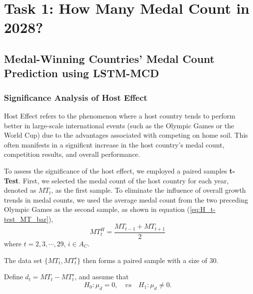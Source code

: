 \documentclass{mcmthesis}
\begin{document}
	
	
	
	
	\newpage
	\section{Task 1: How Many Medal Count in 2028? }
	\subsection{Medal-Winning Countries' Medal Count Prediction using LSTM-MCD}
	
	\subsubsection{Significance Analysis of Host Effect}
	
Host Effect refers to the phenomenon where a host country tends to perform better in large-scale international events (such as the Olympic Games or the World Cup) due to the advantages associated with competing on home soil. This often manifests in a significnt increase in the host country's medal count, competition results, and overall performance.

	
	To assess the significance of the host effect, we employed a paired samples  \textbf{t-Test}. First, we selected the medal count of the host country for each year, denoted as $MT_{t}$, as the first sample. To eliminate the influence of overall growth trends in medal counts, we used the average medal count from the two preceding Olympic Games as the second sample, as shown in equation (\ref{eq:H_t-test_MT_bar}),
	\begin{equation*}
		MT^H_{t}=\frac{ MT_{t-1} + MT_{t+1} }{2}
		\label{eq:H_t-test_MT_bar}
	\end{equation*}
	where $t=2,3,\cdots,29$, $i\in A_{C}$. 
	
	The data set $\{MT_{t},MT^s_{t}\}$ then forms a paired sample with a size of 30. 
	
	Define $d_t= MT_{t} - MT^s_{t}$, and assume that
	\begin{equation*}
		H_0: \mu_d=0, \quad vs \quad H_1:  \mu_d \ne 0.
	\end{equation*}
	
\end{document}
